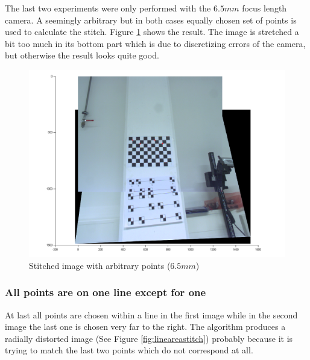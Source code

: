 \documentclass[
a4paper,     %
12pt         %
]{scrartcl}  %
\begin{document}
The last two experiments were only performed with the $6.5mm$ focus length camera.
A seemingly arbitrary but in both cases equally chosen set of points is used to calculate the stitch.
Figure \ref{fig:arbitraryareastitch} shows the result.
The image is stretched a bit too much in its bottom part which is due to discretizing errors of the camera, but otherwise the result looks quite good.

\begin{figure}[ht!]
 \centering
 \includegraphics[scale=0.4]{./Bildg_Messtechnik_Lab/PanoramaStitching/figb4.png}
 \caption{Stitched image with arbitrary points ($6.5mm$)}
 \label{fig:arbitraryareastitch}
\end{figure}

\subsubsection{All points are on one line except for one}

At last all points are chosen within a line in the first image while in the second image the last one is chosen very far to the right.
The algorithm produces a radially distorted image (See Figure  \ref{fig:lineareastitch}) probably because it is trying to match the last two points which do not correspond at all.
\end{document}
